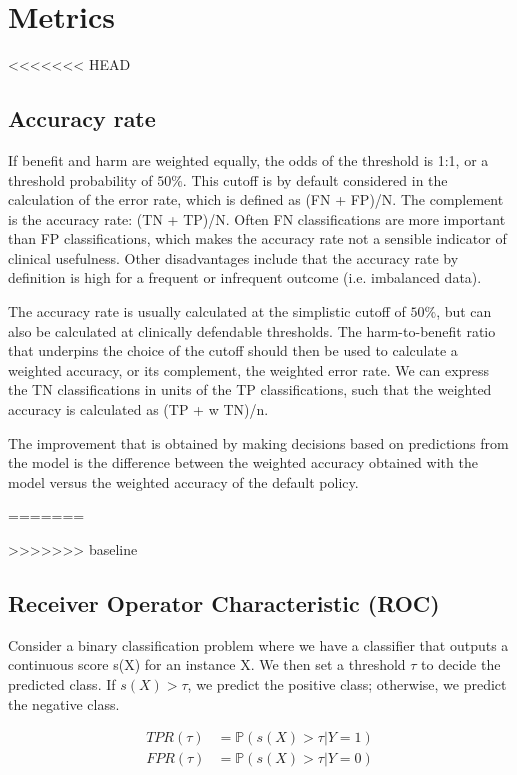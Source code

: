 
\section{Metrics}
<<<<<<< HEAD
\subsection{Accuracy rate}

	If benefit and harm are weighted equally, the odds of the threshold is 1:1, or a threshold probability of $50\%$. 
	This cutoff is by default considered in the calculation of the error rate, which is defined as (FN + FP)/N. 
	The complement is the accuracy rate: (TN + TP)/N.
	Often FN classifications are more important than FP classifications, which makes the accuracy rate not a sensible indicator of clinical usefulness.
	Other disadvantages include that the accuracy rate by definition is high for a frequent or infrequent outcome (i.e. imbalanced data).
	
	The accuracy rate is usually calculated at the simplistic cutoff of $50\%$, but can also be calculated at clinically defendable thresholds. 
	The harm-to-benefit ratio that underpins the choice of the cutoff should then be used to calculate a weighted accuracy, or its complement, the weighted error rate.
	We can express the TN classifications in units of the TP classifications, such that the weighted accuracy is calculated as (TP + w TN)/n.
	
	The improvement that is obtained by making decisions based on predictions from the model is the difference between the weighted accuracy
	obtained with the model versus the weighted accuracy of the default policy.
	
=======

>>>>>>> baseline
\subsection{Receiver Operator Characteristic (ROC)}
	Consider a binary classification problem where we have a classifier that outputs a continuous score s(X) for an instance X.
	We then set a threshold $\tau$ to decide the predicted class. If $s(X) > \tau$, we predict the positive class; otherwise, we predict the negative class.
	
    	\begin{align*}
    		TPR(\tau) &= \mathbb{P}(s(X) > \tau | Y = 1) \\
    		FPR(\tau) &= \mathbb{P}(s(X) > \tau | Y = 0)
    	\end{align*}
	
